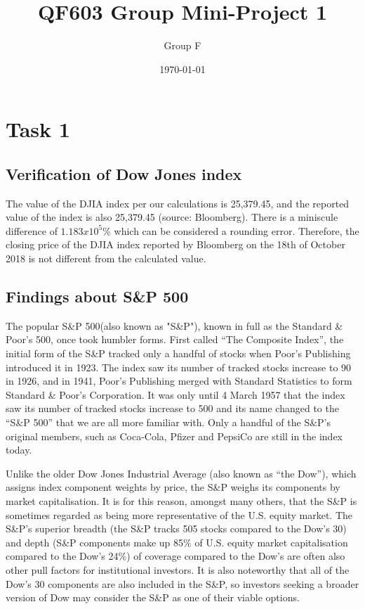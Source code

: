\documentclass[a4paper]{article}
\title{QF603 Group Mini-Project 1}
\author{Group F}
\date{\today}
\begin{document}
\maketitle


\vspace{10mm}
\section{Task 1}
\label{sec:introduction}

\subsection{Verification of Dow Jones index}
The value of the DJIA index per our calculations is 25,379.45, and the reported value of the index is also 25,379.45 (source: Bloomberg). There is a miniscule difference of $1.183x10^5\%$ which can be considered a rounding error. Therefore, the closing price of the DJIA index reported by Bloomberg on the 18th of October 2018 is not different from the calculated value.


\subsection{Findings about S\&P 500}
The popular S\&P 500(also known as "S\&P"), known in full as the Standard \& Poor’s 500, once took humbler forms. First called “The Composite Index”, the initial form of the S\&P tracked only a handful of stocks when Poor’s Publishing introduced it in 1923. The index saw its number of tracked stocks increase to 90 in 1926, and in 1941, Poor’s Publishing merged with Standard Statistics to form Standard \& Poor’s Corporation. It was only until 4 March 1957 that the index saw its number of tracked stocks increase to 500 and its name changed to the “S\&P 500” that we are all more familiar with. Only a handful of the S\&P’s original members, such as Coca-Cola, Pfizer and PepsiCo are still in the index today.

Unlike the older Dow Jones Industrial Average (also known as “the Dow”), which assigns index component weights by price, the S\&P weighs its components by market capitalisation. It is for this reason, amongst many others, that the S\&P is sometimes regarded as being more representative of the U.S. equity market. The S\&P’s superior breadth (the S\&P tracks 505 stocks compared to the Dow’s 30) and depth (S\&P components make up 85\% of U.S. equity market capitalisation compared to the Dow’s 24\%) of coverage compared to the Dow’s are often also other pull factors for institutional investors. It is also noteworthy that all of the Dow’s 30 components are also included in the S\&P, so investors seeking a broader version of Dow may consider the S\&P as one of their viable options.
\end{document}
